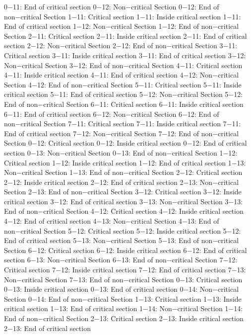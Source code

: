 0−11: End of critical section
0−12: Non−critical Section
0−12: End of non−critical Section
1−11: Critical section
1−11: Inside critical section
1−11: End of critical section
1−12: Non−critical Section
1−12: End of non−critical Section
2−11: Critical section
2−11: Inside critical section
2−11: End of critical section
2−12: Non−critical Section
2−12: End of non−critical Section
3−11: Critical section
3−11: Inside critical section
3−11: End of critical section
3−12: Non−critical Section
3−12: End of non−critical Section
4−11: Critical section
4−11: Inside critical section
4−11: End of critical section
4−12: Non−critical Section
4−12: End of non−critical Section
5−11: Critical section
5−11: Inside critical section
5−11: End of critical section
5−12: Non−critical Section
5−12: End of non−critical Section
6−11: Critical section
6−11: Inside critical section
6−11: End of critical section
6−12: Non−critical Section
6−12: End of non−critical Section
7−11: Critical section
7−11: Inside critical section
7−11: End of critical section
7−12: Non−critical Section
7−12: End of non−critical Section
0−12: Critical section
0−12: Inside critical section
0−12: End of critical section
0−13: Non−critical Section
0−13: End of non−critical Section
1−12: Critical section
1−12: Inside critical section
1−12: End of critical section
1−13: Non−critical Section
1−13: End of non−critical Section
2−12: Critical section
2−12: Inside critical section
2−12: End of critical section
2−13: Non−critical Section
2−13: End of non−critical Section
3−12: Critical section
3−12: Inside critical section
3−12: End of critical section
3−13: Non−critical Section
3−13: End of non−critical Section
4−12: Critical section
4−12: Inside critical section
4−12: End of critical section
4−13: Non−critical Section
4−13: End of non−critical Section
5−12: Critical section
5−12: Inside critical section
5−12: End of critical section
5−13: Non−critical Section
5−13: End of non−critical Section
6−12: Critical section
6−12: Inside critical section
6−12: End of critical section
6−13: Non−critical Section
6−13: End of non−critical Section
7−12: Critical section
7−12: Inside critical section
7−12: End of critical section
7−13: Non−critical Section
7−13: End of non−critical Section
0−13: Critical section
0−13: Inside critical section
0−13: End of critical section
0−14: Non−critical Section
0−14: End of non−critical Section
1−13: Critical section
1−13: Inside critical section
1−13: End of critical section
1−14: Non−critical Section
1−14: End of non−critical Section
2−13: Critical section
2−13: Inside critical section
2−13: End of critical section
